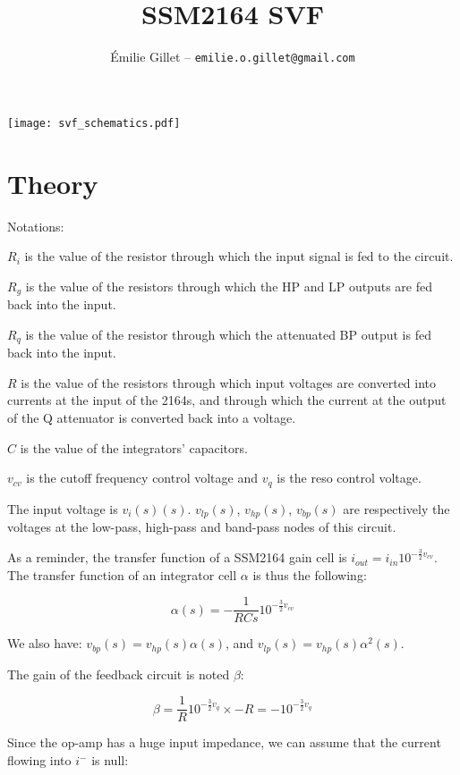 \documentclass[a4paper,11pt]{article}
\title{SSM2164 SVF}
\author{Émilie Gillet -- \tt emilie.o.gillet@gmail.com}
\date{}
\begin{document}
\maketitle

\texttt{[image: svf\_schematics.pdf]}

\section{Theory}

Notations:

$R_i$ is the value of the resistor through which the input signal is fed to the circuit.

$R_g$ is the value of the resistors through which the HP and LP outputs are fed back into the input.

$R_q$ is the value of the resistor through which the attenuated BP output is fed back into the input.

$R$ is the value of the resistors through which input voltages are converted into currents at the input of the 2164s, and through which the current at the output of the Q attenuator is converted back into a voltage.

$C$ is the value of the integrators' capacitors.

$v_{cv}$ is the cutoff frequency control voltage and $v_{q}$ is the reso control voltage.


The input voltage is $v_i(s)(s)$. $v_{lp}(s)$, $v_{hp}(s)$, $v_{bp}(s)$ are respectively the voltages at the low-pass, high-pass and band-pass nodes of this circuit.

As a reminder, the transfer function of a SSM2164 gain cell is $i_{out} = i_{in} 10^{-\frac{3}{2} v_{cv}}$. The transfer function of an integrator cell $\alpha$ is thus the following:

\begin{equation}
\alpha(s) = -\frac{1}{RCs} 10^{-\frac{3}{2} v_{cv}}
\end{equation}

We also have: $v_{bp}(s) = v_{hp}(s) \alpha(s)$, and $v_{lp}(s) = v_{hp}(s) \alpha^2(s)$.

The gain of the feedback circuit is noted $\beta$:

\begin{equation}
\beta = \frac{1}{R} 10^{-\frac{3}{2} v_{q}} \times -R = -10^{-\frac{3}{2} v_{q}}
\end{equation}

Since the op-amp has a huge input impedance, we can assume that the current flowing into $i^-$ is null:
\end{document}
